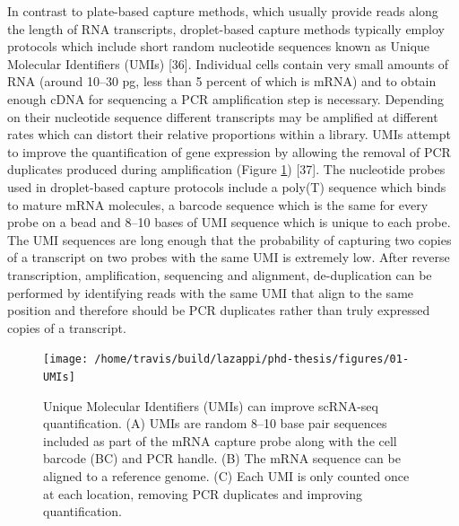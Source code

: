 \documentclass[11pt,a4paper,titlepage,twoside,openright]{style/unimelbthesis}
\theoremstyle{definition}
\theoremstyle{definition}
\theoremstyle{definition}
\theoremstyle{remark}
\begin{document}
\begin{mainmatter}
In contrast to plate-based capture methods, which usually provide reads along the length of RNA transcripts, droplet-based capture methods typically employ protocols which include short random nucleotide sequences known as Unique Molecular Identifiers (UMIs) {[}36{]}. Individual cells contain very small amounts of RNA (around 10--30 pg, less than 5 percent of which is mRNA) and to obtain enough cDNA for sequencing a PCR amplification step is necessary. Depending on their nucleotide sequence different transcripts may be amplified at different rates which can distort their relative proportions within a library. UMIs attempt to improve the quantification of gene expression by allowing the removal of PCR duplicates produced during amplification (Figure \ref{fig:UMIs}) {[}37{]}. The nucleotide probes used in droplet-based capture protocols include a poly(T) sequence which binds to mature mRNA molecules, a barcode sequence which is the same for every probe on a bead and 8--10 bases of UMI sequence which is unique to each probe. The UMI sequences are long enough that the probability of capturing two copies of a transcript on two probes with the same UMI is extremely low. After reverse transcription, amplification, sequencing and alignment, de-duplication can be performed by identifying reads with the same UMI that align to the same position and therefore should be PCR duplicates rather than truly expressed copies of a transcript.

\begin{figure}

{\centering \texttt{[image: /home/travis/build/lazappi/phd-thesis/figures/01-UMIs]} 

}

\caption[Unique Molecular Identifiers (UMIs) can improve scRNA-seq quantification.]{Unique Molecular Identifiers (UMIs) can improve scRNA-seq quantification. (A) UMIs are random 8--10 base pair sequences included as part of the mRNA capture probe along with the cell barcode (BC) and PCR handle. (B) The mRNA sequence can be aligned to a reference genome. (C) Each UMI is only counted once at each location, removing PCR duplicates and improving quantification.}\label{fig:UMIs}
\end{figure}






\end{mainmatter}
\end{document}
